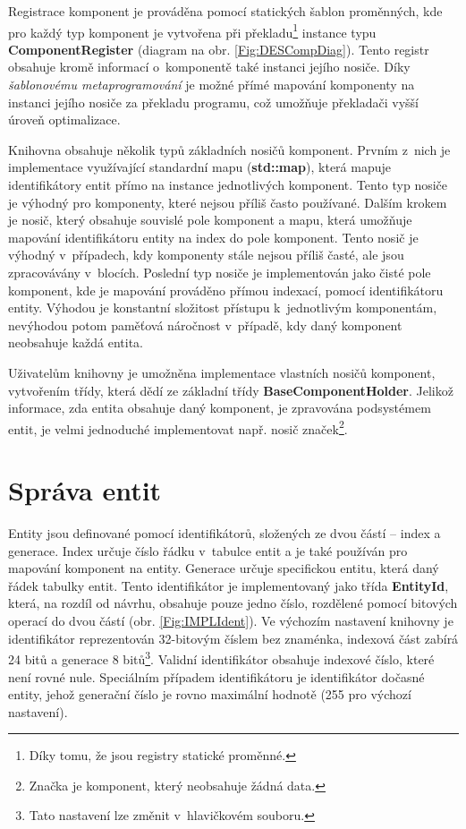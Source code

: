 Registrace komponent je prováděna pomocí statických šablon proměnných, kde pro každý typ komponent je vytvořena při překladu\footnote{Díky tomu, že jsou registry statické proměnné.} instance typu \textbf{ComponentRegister} (diagram na obr. \ref{Fig:DESCompDiag}). Tento registr obsahuje kromě informací o~komponentě také instanci jejího nosiče. Díky \emph{šablonovému metaprogramování} je možné přímé mapování komponenty na instanci jejího nosiče za překladu programu, což umožňuje překladači vyšší úroveň optimalizace.

Knihovna obsahuje několik typů základních nosičů komponent. Prvním z~nich je implementace využívající standardní mapu (\textbf{std::map}), která mapuje identifikátory entit přímo na instance jednotlivých komponent. Tento typ nosiče je výhodný pro komponenty, které nejsou příliš často používané. Dalším krokem je nosič, který obsahuje souvislé pole komponent a mapu, která umožňuje mapování identifikátoru entity na index do pole komponent. Tento nosič je výhodný v~případech, kdy komponenty stále nejsou příliš časté, ale jsou zpracovávány v~blocích. Poslední typ nosiče je implementován jako čisté pole komponent, kde je mapování prováděno přímou indexací, pomocí identifikátoru entity. Výhodou je konstantní složitost přístupu k~jednotlivým komponentám, nevýhodou potom paměťová náročnost v~případě, kdy daný komponent neobsahuje každá entita. 

Uživatelům knihovny je umožněna implementace vlastních nosičů komponent, vytvořením třídy, která dědí ze základní třídy \textbf{BaseComponentHolder}. Jelikož informace, zda entita obsahuje daný komponent, je zpravována podsystémem entit, je velmi jednoduché implementovat např. nosič značek\footnote{Značka je komponent, který neobsahuje žádná data.}. 

\section{Správa entit}

Entity jsou definované pomocí identifikátorů, složených ze dvou částí -- index a generace. Index určuje číslo řádku v~tabulce entit a je také používán pro mapování komponent na entity. Generace určuje specifickou entitu, která  daný řádek tabulky entit. Tento identifikátor je implementovaný jako třída \textbf{EntityId}, která, na rozdíl od návrhu, obsahuje pouze jedno číslo, rozdělené pomocí bitových operací do dvou částí (obr. \ref{Fig:IMPLIdent}). Ve výchozím nastavení knihovny je identifikátor reprezentován 32-bitovým číslem bez znaménka, indexová část zabírá 24 bitů a generace 8 bitů\footnote{Tato nastavení lze změnit v~hlavičkovém souboru.}. Validní identifikátor obsahuje indexové číslo, které není rovné nule. Speciálním případem identifikátoru je identifikátor dočasné entity, jehož generační číslo je rovno maximální hodnotě (255 pro výchozí nastavení).

